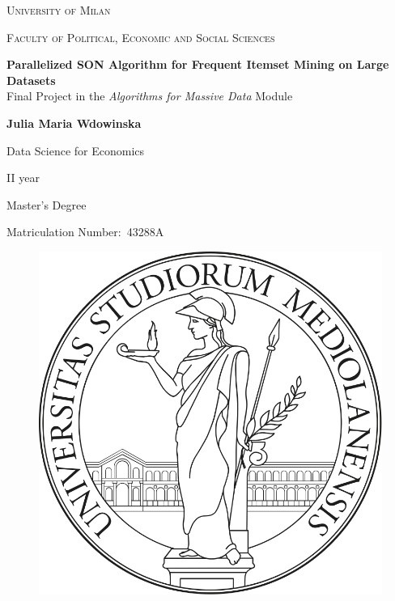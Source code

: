 \documentclass{Class/julia}
\author{Julia Maria Wdowinska}
\date{} %
\begin{document}
\begin{titlepage}
    \centering
    \vfill
    {\scshape\Large University of Milan \par}
    \vspace{0.5cm}
    {\scshape\large Faculty of Political, Economic and Social Sciences \par}
    \vspace{3cm}
    {\huge
    \textbf{Parallelized SON Algorithm for Frequent Itemset Mining on Large Datasets} \\
    \vspace{0.5cm}
    \large Final Project in the \textit{Algorithms for Massive Data} Module \par}
    \vspace{2cm}
    {\large \textbf{Julia Maria Wdowinska} \par}
    \vspace{0.5cm}
    {\large Data Science for Economics \par}
    {\large II year\par}
    {\large Master’s Degree \par}
    {\large Matriculation Number:\ 43288A \par}
\vfill
\begin{center}
\begin{figure}[h!]\centering
 \includegraphics[keepaspectratio=true,scale=0.2]{logo} \\

\end{figure}
\end{center}
\end{titlepage}
\end{document}
